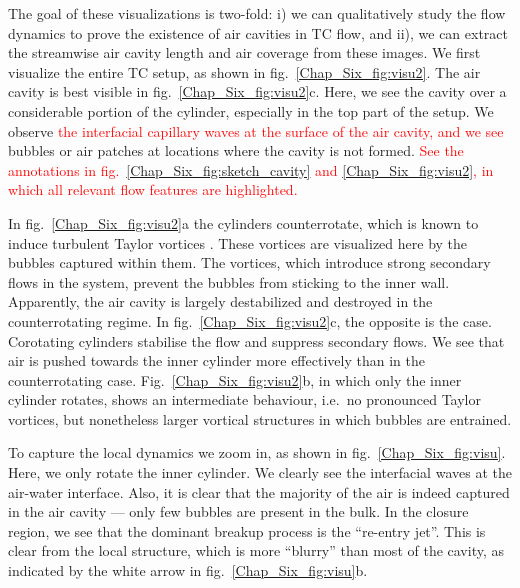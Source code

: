 \documentclass[aps,onecolumn,10pt, floatfix, superscriptaddress,longbibliography, pra]{revtex4-1}
\newcommand{\red}[1]{\textcolor{red}{#1}}
\begin{document}
The goal of these visualizations is two-fold: i) we can qualitatively study the flow dynamics to prove the existence of air cavities in TC flow, and ii), we can extract the streamwise air cavity length and air coverage from these images.  
We first visualize the entire TC setup, as shown in fig.\ \ref{Chap_Six_fig:visu2}. The air cavity is best visible in fig.\ \ref{Chap_Six_fig:visu2}c. Here, we see the cavity over a considerable portion of the cylinder, especially in the top part of the setup. We observe \red{the interfacial capillary waves at the surface of the air cavity, and we see }bubbles or air patches at locations where the cavity is not formed. \red{See the annotations in fig.\ \ref{Chap_Six_fig:sketch_cavity} and \ref{Chap_Six_fig:visu2}, in which all relevant flow features are highlighted.}

In fig.\ \ref{Chap_Six_fig:visu2}a the cylinders counterrotate, which is known to induce turbulent Taylor vortices \citep{gil12,ost14pd}. These vortices are visualized here by the bubbles captured within them. The vortices, which introduce strong secondary flows in the system, prevent the bubbles from sticking to the inner wall. Apparently, the air cavity is largely destabilized and destroyed in the counterrotating regime.
In fig.\ \ref{Chap_Six_fig:visu2}c, the opposite is the case. Corotating cylinders stabilise the flow and suppress secondary flows. We see that air is pushed towards the inner cylinder more effectively than in the counterrotating case. Fig.\ \ref{Chap_Six_fig:visu2}b, in which only the inner cylinder rotates, shows an intermediate behaviour, i.e.\ no pronounced Taylor vortices, but nonetheless larger vortical structures in which bubbles are entrained. 

To capture the local dynamics we zoom in, as shown in fig.\ \ref{Chap_Six_fig:visu}. Here, we only rotate the inner cylinder. We clearly see the interfacial waves at the air-water interface. Also, it is clear that the majority of the air is indeed captured in the air cavity --- only few bubbles are present in the bulk. In the closure region, we see that the dominant breakup process is the ``re-entry jet''. This is clear from the local structure, which is more ``blurry'' than most of the cavity, as indicated by the white arrow in fig.\ \ref{Chap_Six_fig:visu}b. 
\end{document}
